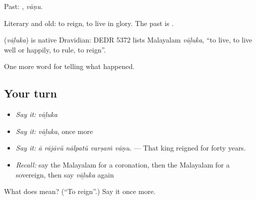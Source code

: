Past: , \emph{vāṇu}.

Literary and old: to reign, to live in glory. The past is .

\begin{cousinweb}
\textbf{} (\emph{vāḻuka}) is native Dravidian: DEDR 5372 lists Malayalam \emph{vāḻuka}, \textquotedblleft{}to live, to live well or happily, to rule, to reign\textquotedblright{}.
\end{cousinweb}

\begin{grammarlens}[title={What you've built}]
One more word for telling what happened.
\end{grammarlens}

\subsection*{Your turn}
\begin{itemize}
\raggedright
  \item \emph{Say it:} \emph{vāḻuka}
  \item \emph{Say it:} \emph{vāḻuka}, once more
  \item \emph{Say it:} \emph{ā rājāvŭ nālpatŭ varṣaṁ vāṇu.} — That king reigned for forty years.
  \item \emph{Recall:} say the Malayalam for a coronation, then the Malayalam for a sovereign, then say \emph{vāḻuka} again
\end{itemize}

\begin{tcolorbox}[breakable,colback=teal!4,colframe=teal!35!black,title={Before you move on}]
What does  mean? (\textquotedblleft{}To reign\textquotedblright{}.) Say it once more.
\end{tcolorbox}
